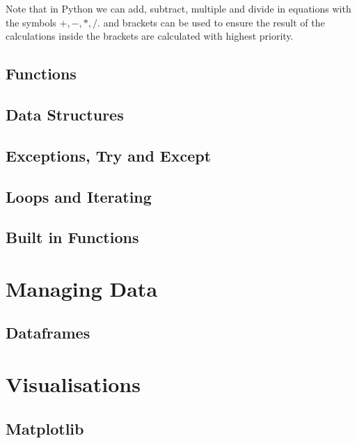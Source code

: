 \documentclass[
]{book}
\begin{document}
Note that in Python we can add, subtract, multiple and divide in equations with the symbols \(+, -, *, /.\) and brackets can be used to ensure the result of the calculations inside the brackets are calculated with highest priority.

\hypertarget{functions}{%
\subsection{Functions}\label{functions}}

\hypertarget{data-structures}{%
\subsection{Data Structures}\label{data-structures}}

\hypertarget{exceptions-try-and-except}{%
\subsection{Exceptions, Try and Except}\label{exceptions-try-and-except}}

\hypertarget{loops-and-iterating}{%
\subsection{Loops and Iterating}\label{loops-and-iterating}}

\hypertarget{built-in-functions}{%
\subsection{Built in Functions}\label{built-in-functions}}

\hypertarget{managing-data}{%
\section{Managing Data}\label{managing-data}}

\hypertarget{dataframes}{%
\subsection{Dataframes}\label{dataframes}}

\hypertarget{visualisations}{%
\section{Visualisations}\label{visualisations}}

\hypertarget{matplotlib}{%
\subsection{Matplotlib}\label{matplotlib}}
\end{document}
